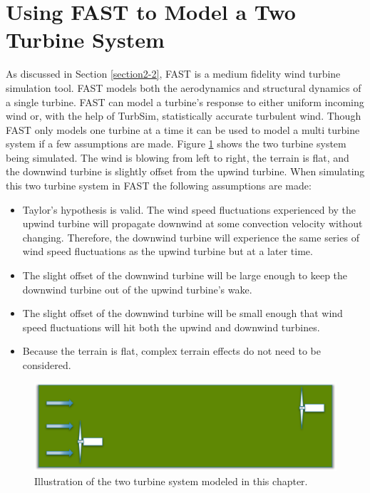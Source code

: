
\section{Using FAST to Model a Two Turbine System} \label{section3-2}

As discussed in Section \ref{section2-2}, FAST is a medium fidelity wind turbine simulation tool. FAST models both the aerodynamics and structural dynamics of a single turbine. FAST can model a turbine's response to either uniform incoming wind or, with the help of TurbSim, statistically accurate turbulent wind. Though FAST only models one turbine at a time it can be used to model a multi turbine system if a few assumptions are made. Figure \ref{fig3-5} shows the two turbine system being simulated. The wind is blowing from left to right, the terrain is flat, and the downwind turbine is slightly offset from the upwind turbine. When simulating this two turbine system in FAST the following assumptions are made:

\begin{itemize}
  \item Taylor's hypothesis is valid. The wind speed fluctuations experienced by the upwind turbine will propagate downwind at some convection velocity without changing. Therefore, the downwind turbine will experience the same series of wind speed fluctuations as the upwind turbine but at a later time.
  \item The slight offset of the downwind turbine will be large enough to keep the downwind turbine out of the upwind turbine's wake.
  \item The slight offset of the downwind turbine will be small enough that wind speed fluctuations will hit both the upwind and downwind turbines.
  \item Because the terrain is flat, complex terrain effects do not need to be considered.
\end{itemize}


 \begin{figure}[htbp]
	\centering
		\includegraphics[width=\linewidth]{Figures/ch3Figures/fig3-5.png}
		
	\caption{Illustration of the two turbine system modeled in this chapter.}
	\label{fig3-5}
\end{figure}

